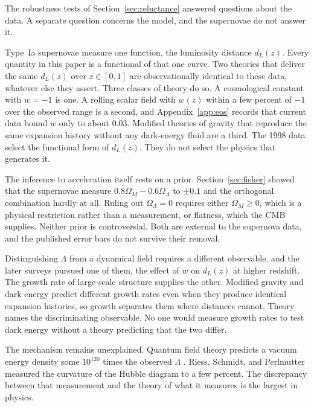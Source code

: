 \documentclass[12pt]{article}
\begin{document}
The robustness tests of Section~\ref{sec:reluctance} answered questions about
the data.  A separate question concerns the model, and the supernovae do not
answer it.

Type~Ia supernovae measure one function, the luminosity distance $d_L(z)$.
Every quantity in this paper is a functional of that one curve.  Two theories
that deliver the same $d_L(z)$ over $z \in [0, 1]$ are observationally
identical to these data, whatever else they assert.  Three classes of theory
do so.  A cosmological constant with $w = -1$ is one.  A rolling scalar field
with $w(z)$ within a few percent of $-1$ over the observed range is a second,
and Appendix~\ref{app:eos} records that current data bound $w$ only to about
$0.03$.  Modified theories of gravity that reproduce the same expansion
history without any dark-energy fluid are a third.  The 1998 data select the
functional form of $d_L(z)$.  They do not select the physics that generates
it.

The inference to acceleration itself rests on a prior.
Section~\ref{sec:fisher} showed that the supernovae measure
$0.8\Omega_M - 0.6\Omega_\Lambda$ to $\pm0.1$ and the orthogonal combination
hardly at all.  Ruling out $\Omega_\Lambda = 0$ requires either
$\Omega_M \geq 0$, which is a physical restriction rather than a measurement,
or flatness, which the CMB supplies.  Neither prior is controversial.  Both
are external to the supernova data, and the published error bars do not
survive their removal.

Distinguishing $\Lambda$ from a dynamical field requires a different
observable.  \citet{Riess2004} and the later surveys pursued one of them, the
effect of $w$ on $d_L(z)$ at higher redshift.  The growth rate of large-scale
structure supplies the other.  Modified gravity and dark energy predict
different growth rates even when they produce identical expansion histories,
so growth separates them where distances cannot.  Theory names the
discriminating observable.  No one would measure growth rates to test dark
energy without a theory predicting that the two differ.

The mechanism remains unexplained.  Quantum field theory predicts a vacuum
energy density some $10^{120}$ times the observed $\Lambda$
\citep{Weinberg1989}.  Riess, Schmidt, and Perlmutter measured the curvature
of the Hubble diagram to a few percent.  The discrepancy between that
measurement and the theory of what it measures is the largest in physics.

\end{document}
